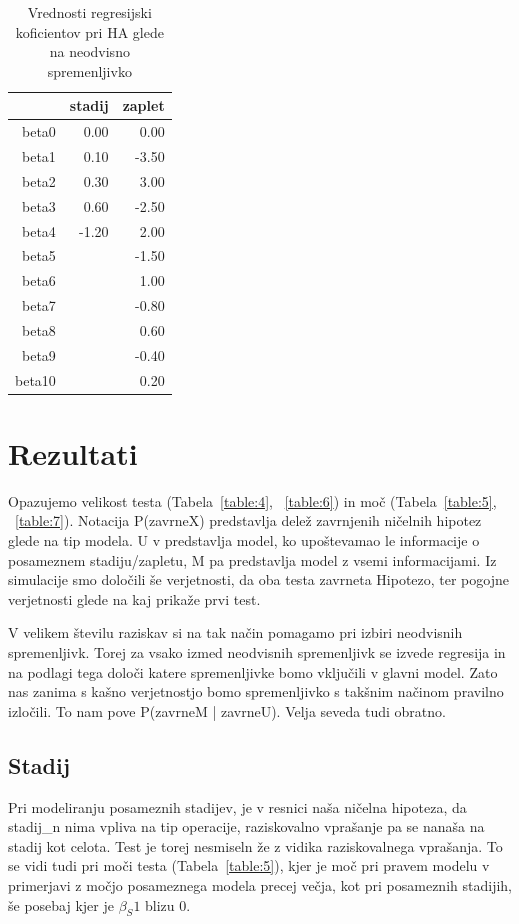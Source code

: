 \documentclass[letterpaper,11pt]{article}
\begin{document}
\begin{table}[ht]
\centering
\begin{tabular}{rrr}
  \hline
 & stadij & zaplet \\ 
  \hline
beta0 & 0.00 & 0.00 \\ 
  beta1 & 0.10 & -3.50 \\ 
  beta2 & 0.30 & 3.00 \\ 
  beta3 & 0.60 & -2.50 \\ 
  beta4 & -1.20 & 2.00 \\ 
  beta5 &  & -1.50 \\ 
  beta6 &  & 1.00 \\ 
  beta7 &  & -0.80 \\ 
  beta8 &  & 0.60 \\ 
  beta9 &  & -0.40 \\ 
  beta10 &  & 0.20 \\ 
   \hline
\end{tabular}
\caption{Vrednosti regresijski koficientov pri HA glede na neodvisno spremenljivko} 
\label{table:3}
\end{table}
\newpage
\section{Rezultati}
Opazujemo velikost testa (Tabela~\ref{table:4}, ~\ref{table:6}) in moč (Tabela~\ref{table:5}, ~\ref{table:7}). Notacija P(zavrneX) predstavlja delež zavrnjenih ničelnih hipotez glede na tip modela. U v predstavlja model, ko upoštevamao le informacije o posameznem stadiju/zapletu, M pa predstavlja model z vsemi informacijami. Iz simulacije smo določili še verjetnosti, da oba testa zavrneta Hipotezo, ter pogojne verjetnosti glede na kaj prikaže prvi test. 

V velikem številu raziskav si na tak način pomagamo pri izbiri neodvisnih spremenljivk. Torej za vsako izmed neodvisnih spremenljivk se izvede regresija in na podlagi tega določi katere spremenljivke bomo vključili v glavni model. Zato nas zanima s kašno verjetnostjo bomo spremenljivko s takšnim načinom pravilno izločili. To nam pove P(zavrneM | zavrneU). Velja seveda tudi obratno.
\subsection{Stadij}
Pri modeliranju posameznih stadijev, je v resnici naša ničelna hipoteza, da stadij_n nima vpliva na tip operacije, raziskovalno vprašanje pa se nanaša na stadij kot celota. Test je torej nesmiseln že z vidika raziskovalnega vprašanja. To se vidi tudi pri moči testa (Tabela~\ref{table:5}), kjer je moč pri pravem modelu v primerjavi z močjo posameznega modela precej večja, kot pri posameznih stadijih, še posebaj kjer je $\beta_S1$ blizu 0.
\end{document}
